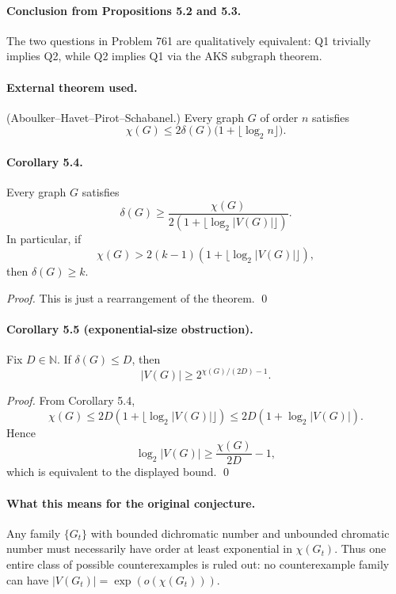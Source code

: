 \paragraph{Conclusion from Propositions 5.2 and 5.3.}
The two questions in Problem 761 are qualitatively equivalent: Q1 trivially implies Q2, while Q2 implies Q1 via the AKS subgraph theorem.

\paragraph{External theorem used.}
(Aboulker--Havet--Pirot--Schabanel.) Every graph $G$ of order $n$ satisfies
\[
\chi(G)\le 2\delta(G)\bigl(1+\lfloor\log_2 n\rfloor\bigr).
\]

\paragraph{Corollary 5.4.}
Every graph $G$ satisfies
\[
\delta(G)\ge \frac{\chi(G)}{2(1+\lfloor\log_2 |V(G)|\rfloor)}.
\]
In particular, if
\[
\chi(G)>2(k-1)(1+\lfloor\log_2 |V(G)|\rfloor),
\]
then $\delta(G)\ge k$.

\emph{Proof.}
This is just a rearrangement of the theorem. \qed

\paragraph{Corollary 5.5 (exponential-size obstruction).}
Fix $D\in\mathbb N$. If $\delta(G)\le D$, then
\[
|V(G)|\ge 2^{\chi(G)/(2D)-1}.
\]

\emph{Proof.}
From Corollary 5.4,
\[
\chi(G)\le 2D(1+\lfloor\log_2 |V(G)|\rfloor)\le 2D(1+\log_2 |V(G)|).
\]
Hence
\[
\log_2 |V(G)|\ge \frac{\chi(G)}{2D}-1,
\]
which is equivalent to the displayed bound. \qed

\paragraph{What this means for the original conjecture.}
Any family $\{G_t\}$ with bounded dichromatic number and unbounded chromatic number must necessarily have order at least exponential in $\chi(G_t)$. Thus one entire class of possible counterexamples is ruled out: no counterexample family can have $|V(G_t)|=\exp(o(\chi(G_t)))$.

